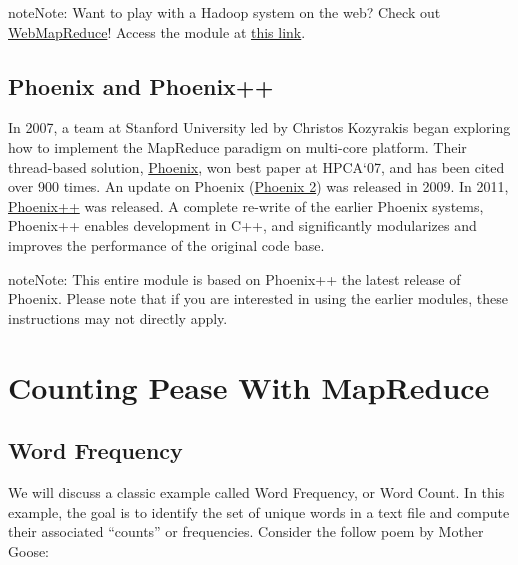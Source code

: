 \documentclass[letterpaper,10pt,openany,oneside]{sphinxmanual}
\begin{document}
\begin{notice}{note}{Note:}
Want to play with a Hadoop system on the web? Check out \href{http://csinparallel.org/csinparallel/modules/IntroWMR.html}{WebMapReduce}!
Access the module at \href{http://csinparallel.org/csinparallel/modules/IntroWMR.html}{this link}.
\end{notice}


\section{Phoenix and Phoenix++}
\label{MRIntro/MRIntro:phoenix-and-phoenix}
In 2007, a team at Stanford University led by Christos Kozyrakis began
exploring how to implement the MapReduce paradigm on multi-core platform. Their
thread-based solution, \href{http://csl.stanford.edu/~christos/publications/2007.cmp\_mapreduce.hpca.pdf}{Phoenix},
won best paper at HPCA`07, and has been cited over 900 times. An update on Phoenix (\href{http://csl.stanford.edu/~christos/publications/2009.scalable\_phoenix.iiswc.pdf}{Phoenix 2})
was released in 2009. In 2011, \href{https://research.tableau.com/sites/default/files/mapreduce2011-talbot-phoenixplusplus.pdf}{Phoenix++} was released.
A complete re-write of the earlier Phoenix systems, Phoenix++ enables
development in C++, and significantly modularizes and improves the
performance of the original code base.

\begin{notice}{note}{Note:}
This entire module is based on Phoenix++ the latest release of
Phoenix. Please note that if you are interested in using the earlier
modules, these instructions may not directly apply.
\end{notice}


\chapter{Counting Pease With MapReduce}
\label{wordcount/wordcount::doc}\label{wordcount/wordcount:counting-pease-with-mapreduce}

\section{Word Frequency}
\label{wordcount/wordcount:word-frequency}
We will discuss a classic example called Word Frequency, or Word Count. In this
example, the goal is to identify the set of unique words in a text file and
compute their associated ``counts'' or frequencies. Consider the follow poem by
Mother Goose:
\end{document}
